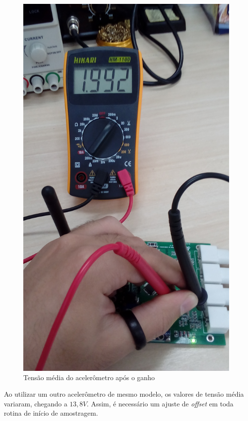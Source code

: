 \documentclass[11pt]{abntex2}
\begin{document}
\begin{figure}[!ht]
\begin{minipage}{0.4\linewidth}
							\includegraphics[angle=-90,width = \linewidth]{../Fotos/tensaoAccG.jpg}
							\caption{Tensão média do acelerômetro após o ganho}
						\end{minipage}
					\end{figure}

					Ao utilizar um outro acelerômetro de mesmo modelo, os
					valores de tensão média variaram, chegando a $13,8V$. Assim,
					é necessário um ajuste de \textit{offset} em toda rotina de
					início de amostragem.
\end{document}

